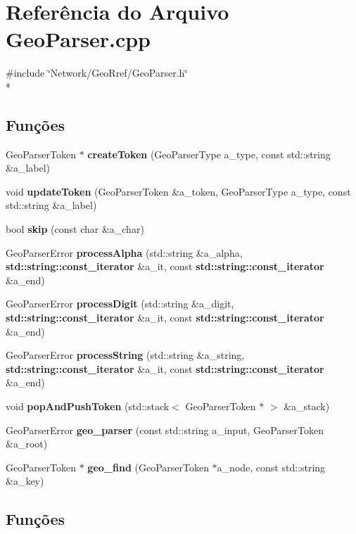 \section{Referência do Arquivo Geo\+Parser.\+cpp}
\label{_geo_parser_8cpp}
{\ttfamily \#include \char`\"{}Network/\+Geo\+Rref/\+Geo\+Parser.\+h\char`\"{}}\\*
\subsection*{Funções}
\begin{DoxyCompactItemize}
\item 
Geo\+Parser\+Token $\ast$ {\bf create\+Token} (Geo\+Parser\+Type a\+\_\+type, const std\+::string \&a\+\_\+label)
\item 
void {\bf update\+Token} (Geo\+Parser\+Token \&a\+\_\+token, Geo\+Parser\+Type a\+\_\+type, const std\+::string \&a\+\_\+label)
\item 
bool {\bf skip} (const char \&a\+\_\+char)
\item 
Geo\+Parser\+Error {\bf process\+Alpha} (std\+::string \&a\+\_\+alpha, {\bf std\+::string\+::const\+\_\+iterator} \&a\+\_\+it, const {\bf std\+::string\+::const\+\_\+iterator} \&a\+\_\+end)
\item 
Geo\+Parser\+Error {\bf process\+Digit} (std\+::string \&a\+\_\+digit, {\bf std\+::string\+::const\+\_\+iterator} \&a\+\_\+it, const {\bf std\+::string\+::const\+\_\+iterator} \&a\+\_\+end)
\item 
Geo\+Parser\+Error {\bf process\+String} (std\+::string \&a\+\_\+string, {\bf std\+::string\+::const\+\_\+iterator} \&a\+\_\+it, const {\bf std\+::string\+::const\+\_\+iterator} \&a\+\_\+end)
\item 
void {\bf pop\+And\+Push\+Token} (std\+::stack$<$ Geo\+Parser\+Token $\ast$ $>$ \&a\+\_\+stack)
\item 
Geo\+Parser\+Error {\bf geo\+\_\+parser} (const std\+::string a\+\_\+input, Geo\+Parser\+Token \&a\+\_\+root)
\item 
Geo\+Parser\+Token $\ast$ {\bf geo\+\_\+find} (Geo\+Parser\+Token $\ast$a\+\_\+node, const std\+::string \&a\+\_\+key)
\end{DoxyCompactItemize}


\subsection{Funções}
